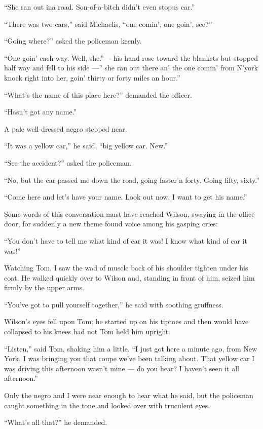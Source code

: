 \documentclass{znotebook}
\begin{document}
``She ran out ina road. Son-of-a-bitch didn't even stopus car.''

``There was two cars,'' said Michaelis, ``one comin', one goin', see?''

``Going where?'' asked the policeman keenly.

``One goin' each way. Well, she.''---{} his hand rose toward the blankets but stopped half way and fell to his side ---'' she ran out there an' the one comin' from N'york knock right into her, goin' thirty or forty miles an hour.''

``What's the name of this place here?'' demanded the officer.

``Hasn't got any name.''

A pale well-dressed negro stepped near.

``It was a yellow car,'' he said, ``big yellow car. New.''

``See the accident?'' asked the policeman.

``No, but the car passed me down the road, going faster'n forty. Going fifty, sixty.''

``Come here and let's have your name. Look out now. I want to get his name.''

Some words of this conversation must have reached Wilson, swaying in the office door, for suddenly a new theme found voice among his gasping cries:

``You don't have to tell me what kind of car it was! I know what kind of car it was!''

Watching Tom, I saw the wad of muscle back of his shoulder tighten under his coat. He walked quickly over to Wilson and, standing in front of him, seized him firmly by the upper arms.

``You've got to pull yourself together,'' he said with soothing gruffness.

Wilson's eyes fell upon Tom; he started up on his tiptoes and then would have collapsed to his knees had not Tom held him upright.

``Listen,'' said Tom, shaking him a little. ``I just got here a minute ago, from New York. I was bringing you that coupe we've been talking about. That yellow car I was driving this afternoon wasn't mine ---{} do you hear? I haven't seen it all afternoon.''

Only the negro and I were near enough to hear what he said, but the policeman caught something in the tone and looked over with truculent eyes.

``What's all that?'' he demanded.
\end{document}
